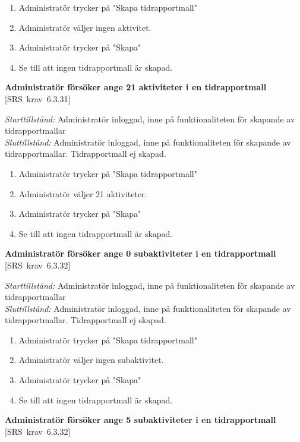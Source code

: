 \documentclass[a4paper]{article}
\def\reqinside{\hfil\penalty 100 \hfilneg \hbox}
\def \req [#1]{\reqinside{[SRS krav #1]}}
\begin{document}
\begin{FT}
\begin{enumerate}
\item Administratör trycker på "Skapa tidrapportmall"
\item Administratör väljer ingen aktivitet.
\item Administratör trycker på "Skapa"
\item Se till att ingen tidrapportmall är skapad.
\end{enumerate}

\item
\textbf{Administratör försöker ange 21 aktiviteter i en tidrapportmall} \req[6.3.31]

\emph{Starttillstånd:} Administratör inloggad, inne på funktionaliteten för skapande av tidrapportmallar\\
\emph{Sluttillstånd:} Administratör inloggad, inne på funktionaliteten för skapande av tidrapportmallar. Tidrapportmall ej skapad.\\

\begin{enumerate}
\item Administratör trycker på "Skapa tidrapportmall"
\item Administratör väljer 21 aktiviteter.
\item Administratör trycker på "Skapa"
\item Se till att ingen tidrapportmall är skapad.
\end{enumerate}


\item
\textbf{Administratör försöker ange 0 subaktiviteter i en tidrapportmall} \req[6.3.32]

\emph{Starttillstånd:} Administratör inloggad, inne på funktionaliteten för skapande av tidrapportmallar\\
\emph{Sluttillstånd:} Administratör inloggad, inne på funktionaliteten för skapande av tidrapportmallar. Tidrapportmall ej skapad.\\

\begin{enumerate}
\item Administratör trycker på "Skapa tidrapportmall"
\item Administratör väljer ingen subaktivitet.
\item Administratör trycker på "Skapa"
\item Se till att ingen tidrapportmall är skapad.
\end{enumerate}


\item
\textbf{Administratör försöker ange 5 subaktiviteter i en tidrapportmall} \req[6.3.32]


\end{FT}
\end{document}
